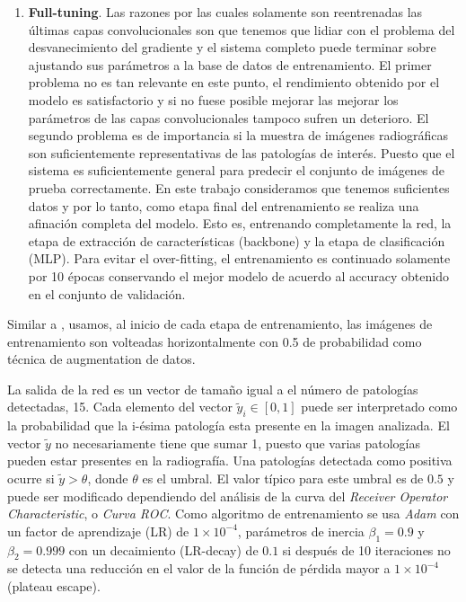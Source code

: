 {\begin{enumerate}
    \item \textbf{Full-tuning}. Las razones por las cuales solamente son reentrenadas las últimas
          capas convolucionales son que tenemos que lidiar con el problema del desvanecimiento del
          gradiente y el sistema completo puede terminar sobre ajustando sus parámetros a la base de
          datos de entrenamiento. El primer problema no es tan relevante en este punto, el
          rendimiento obtenido por el modelo es satisfactorio y si no fuese posible mejorar las
          mejorar los parámetros de las capas convolucionales tampoco sufren un deterioro. El segundo
          problema es de importancia si la muestra de imágenes radiográficas son suficientemente
          representativas de las patologías de interés. Puesto que el sistema es suficientemente
          general para predecir el conjunto de imágenes de prueba correctamente. En este trabajo
          consideramos que tenemos suficientes datos y por lo tanto, como etapa final del entrenamiento
          se realiza una afinación completa del modelo. Esto es, entrenando completamente la red,
          la etapa de extracción de características (backbone) y la etapa de clasificación (MLP).
          Para evitar el over-fitting, el entrenamiento es continuado solamente por 10 épocas
          conservando el mejor modelo de acuerdo al accuracy obtenido en el conjunto de validación.

\end{enumerate}

Similar a \citeauthor{rajpurkar2018deep}, usamos, al inicio de cada etapa de entrenamiento, las
imágenes de entrenamiento son volteadas horizontalmente con 0.5 de probabilidad como técnica de
augmentation de datos.

La salida de la red es un vector de tamaño igual a el número de patologías detectadas, 15. Cada
elemento del vector $\tilde y_i \in [0,1]$ puede ser interpretado como la probabilidad que la
i-ésima patología esta presente en la imagen analizada. El vector $\tilde y$ no necesariamente tiene
que sumar 1, puesto que varias patologías pueden estar presentes en la radiografía. Una patologías
detectada como positiva ocurre si  $\tilde y > \theta$, donde $\theta$ es el umbral. El valor típico
para este umbral es de $0.5$ y puede ser modificado dependiendo del análisis de la curva del \textit{Receiver
Operator Characteristic}, o \textit{Curva ROC}. Como algoritmo de entrenamiento se usa \emph{Adam}
\cite{kingma2017adam} con un factor de aprendizaje (LR) de $1\times 10^{-4}$, parámetros de inercia
$\beta_1=0.9$ y $\beta_2=0.999$ con un decaimiento (LR-decay) de $0.1$ si después de 10 iteraciones
no se detecta una reducción en el valor de la función de pérdida mayor a $1\times 10^{-4}$ (plateau
escape).

}
